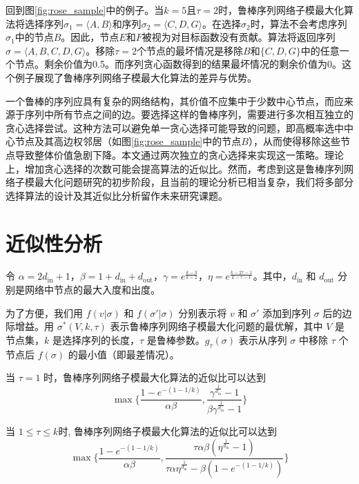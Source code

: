 回到图\ref{fig:rose_sample}中的例子。当\(k=5\)且\(\tau=2\)时，鲁棒序列网络子模最大化算法将选择序列\(\sigma_1=\langle A,B \rangle\)和序列\(\sigma_2=\langle C,D,G \rangle\)。在选择\(\sigma_2\)时，算法不会考虑序列\(\sigma_1\)中的节点\(B\)。因此，节点\(E\)和\(F\)被视为对目标函数没有贡献。算法将返回序列\(\sigma=\langle A,B,C,D,G \rangle\)。移除\(\tau=2\)个节点的最坏情况是移除\(B\)和\(\{C,D,G\}\)中的任意一个节点。剩余价值为0.5。而序列贪心函数得到的结果最坏情况的剩余价值为0。这个例子展现了鲁棒序列网络子模最大化算法的差异与优势。

一个鲁棒的序列应具有复杂的网络结构，其价值不应集中于少数中心节点，而应来源于序列中所有节点之间的边。要选择这样的鲁棒序列，需要进行多次相互独立的贪心选择尝试。这种方法可以避免单一贪心选择可能导致的问题，即高概率选中中心节点及其高边权邻居（如图\ref{fig:rose_sample}中的节点$B$），从而使得移除这些节点导致整体价值急剧下降。本文通过两次独立的贪心选择来实现这一策略。理论上，增加贪心选择的次数可能会提高算法的近似比。然而，考虑到这是鲁棒序列网络子模最大化问题研究的初步阶段，且当前的理论分析已相当复杂，我们将多部分选择算法的设计及其近似比分析留作未来研究课题。

\section{近似性分析}

令 $\alpha=2 d_{\text{in}}+1$，$\beta=1+d_{\text{in}}+d_{\text{out}}$，$\gamma=e^{\frac{k-3}{k-2}}$，$\eta=e^{\frac{k-2\tau-1}{k-\tau-1}}$。其中，$d_{\text{in}}$ 和 $d_{\text{out}}$ 分别是网络中节点的最大入度和出度。

为了方便，我们用 $f(v|\sigma)$ 和 $f(\sigma'|\sigma)$ 分别表示将 $v$ 和 $\sigma'$ 添加到序列 $\sigma$ 后的边际增益。用 $\sigma^*(V,k,\tau)$ 表示鲁棒序列网络子模最大化问题的最优解，其中 $V$ 是节点集，$k$ 是选择序列的长度，$\tau$ 是鲁棒参数。$g_\tau(\sigma)$ 表示从序列 $\sigma$ 中移除 $\tau$ 个节点后 $f(\sigma)$ 的最小值（即最差情况）。

\begin{theorem}
\label{thm:tau1}
当 $\tau=1$ 时，鲁棒序列网络子模最大化算法的近似比可以达到
\begin{equation}
\max\{\frac{1-e^{-(1-1/k)}}{\alpha\beta},\frac{\gamma^{\frac{1}{d_{\text{in}}}}-1}{\beta \gamma^{\frac{1}{d_{\text{in}}}}-1}\}\end{equation}
\end{theorem}

\begin{theorem}
\label{thm:tau2}
当 $1\le \tau \le k$时, 鲁棒序列网络子模最大化算法的近似比可以达到
\begin{equation}
 \max\{\frac{1-e^{-(1-1/k)}}{\alpha\beta},\frac{\tau\alpha\beta(\eta^{\frac{1}{d_{\text{in}}}}-1)}{\tau\alpha\eta^{\frac{1}{d_{\text{in}}}}- \beta (1-e^{-(1-1/k)}) }\}    
\end{equation}
\end{theorem}

